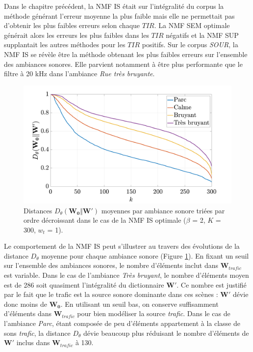 Dans le chapitre précédent, la NMF IS était sur l'intégralité du corpus la méthode générant l'erreur moyenne la plus faible mais elle ne permettait pas d'obtenir les plus faibles erreurs selon chaque $TIR$. La NMF SEM optimale générait alors les erreurs les plus faibles dans les $TIR$ négatifs et la NMF SUP supplantait les autres méthodes pour les $TIR$ positifs. 
Sur le corpus \textit{SOUR}, la NMF IS se révèle être la méthode obtenant les plus faibles erreurs sur l'ensemble des ambiances sonores. Elle parvient notamment à être plus performante que le filtre à 20 kHz dans l'ambiance \textit{Rue très bruyante}. 

\begin{figure}[h]
\centering
\includegraphics[width=.7\linewidth]{./figures/resultats/dist_grafic.pdf}
\caption{Distances $D_{\theta}(\mathbf{W_0}\Vert \mathbf{W'})$ moyennes par ambiance sonore triées par ordre décroissant  dans le cas de la NMF IS optimale ($\beta$ = 2, $K$ = 300, $w_t$ = 1).}
\label{fig:dist_grafic}
\end{figure}

Le comportement de la NMF IS peut s'illustrer au travers des évolutions de la distance $D_{\theta}$ moyenne pour chaque ambiance sonore (Figure \ref{fig:dist_grafic}).
En fixant un seuil sur l'ensemble des ambiances sonores, le nombre d'éléments inclut dans $\mathbf{W}_{trafic}$ est variable. 
Dans le cas de l'ambiance \textit{Très bruyant}, le nombre d'éléments moyen est de 286 soit quasiment l'intégralité du dictionnaire $\mathbf{W'}$. Ce nombre est justifié par le fait que le trafic est la source sonore dominante dans ces scènes : $\mathbf{W'}$ dévie donc moins de $\mathbf{W_0}$. En utilisant un seuil bas, on conserve suffisamment d'éléments dans $\mathbf{W}_{trafic}$ pour bien modéliser la source \textit{trafic}.
Dans le cas de l'ambiance \textit{Parc}, étant composée de peu d'éléments appartement à la classe de sons \textit{trafic}, la distance $D_{\theta}$ dévie beaucoup plus réduisant le nombre d'éléments de $\mathbf{W'}$ inclus dans $\mathbf{W}_{trafic}$ à 130.

